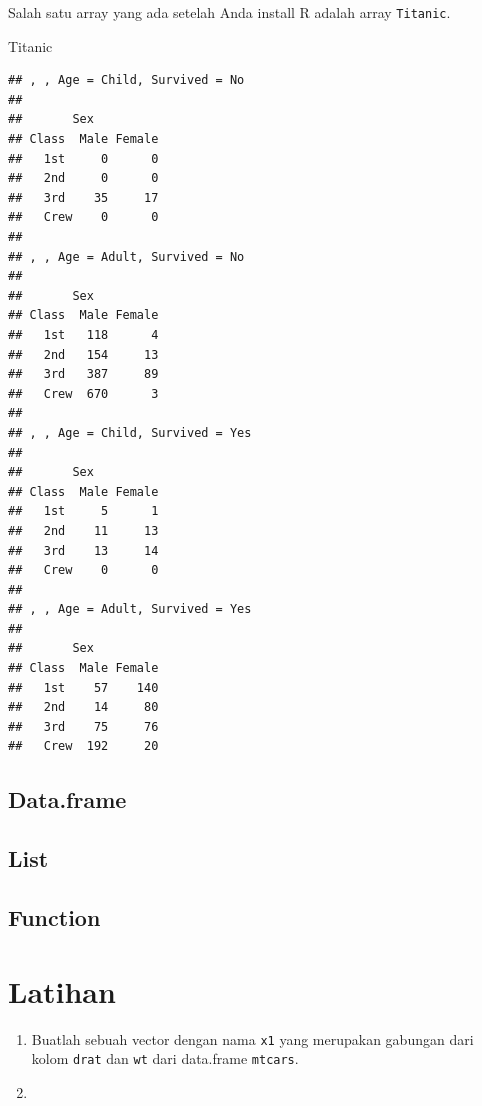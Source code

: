 \documentclass[]{book}
\newenvironment{Shaded}{\begin{snugshade}}{\end{snugshade}}
\newcommand{\NormalTok}[1]{#1}
\begin{document}
Salah satu array yang ada setelah Anda install R adalah array \texttt{Titanic}.

\begin{Shaded}
\begin{Highlighting}[]
\NormalTok{Titanic}
\end{Highlighting}
\end{Shaded}

\begin{verbatim}
## , , Age = Child, Survived = No
## 
##       Sex
## Class  Male Female
##   1st     0      0
##   2nd     0      0
##   3rd    35     17
##   Crew    0      0
## 
## , , Age = Adult, Survived = No
## 
##       Sex
## Class  Male Female
##   1st   118      4
##   2nd   154     13
##   3rd   387     89
##   Crew  670      3
## 
## , , Age = Child, Survived = Yes
## 
##       Sex
## Class  Male Female
##   1st     5      1
##   2nd    11     13
##   3rd    13     14
##   Crew    0      0
## 
## , , Age = Adult, Survived = Yes
## 
##       Sex
## Class  Male Female
##   1st    57    140
##   2nd    14     80
##   3rd    75     76
##   Crew  192     20
\end{verbatim}

\hypertarget{dataframe}{%
\subsection{Data.frame}\label{dataframe}}

\hypertarget{list}{%
\subsection{List}\label{list}}

\hypertarget{function}{%
\subsection{Function}\label{function}}

\hypertarget{latihan}{%
\section{Latihan}\label{latihan}}

\begin{enumerate}
\def\labelenumi{\arabic{enumi}.}
\item
  Buatlah sebuah vector dengan nama \texttt{x1} yang merupakan gabungan dari kolom \texttt{drat} dan \texttt{wt} dari data.frame \texttt{mtcars}.
\item
\end{enumerate}
\end{document}

